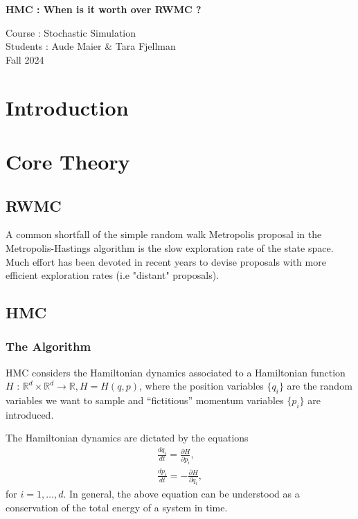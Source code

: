 \documentclass[a4paper, 12pt,oneside]{article}
\begin{document}
 
	\begin{center}
	    \Large
	    \textbf{HMC : When is it worth over RWMC ?} 
	    \vspace{0.4cm}
	    \large

		Course : Stochastic Simulation \\
	    Students : Aude Maier \& Tara Fjellman \\
	    \small{Fall 2024}
	\end{center}

	\section{Introduction}
	\section{Core Theory}
		\subsection{RWMC}
		A common shortfall of the simple random walk Metropolis proposal in the Metropolis-Hastings algorithm is the slow exploration rate of the state space. Much effort has been devoted in recent years to devise proposals with more efficient exploration rates (i.e "distant" proposals).
		\subsection{HMC}
			\subsubsection{The Algorithm}
			HMC considers the Hamiltonian dynamics associated to a Hamiltonian function $H$ : $\mathbb{R}^d \times \mathbb{R}^d \rightarrow \mathbb{R}, H=H(q, p)$, where the position variables $\{q_i\}$ are the random variables we want to sample and ``fictitious'' momentum variables $\{p_i\}$ are introduced. 
			
			The Hamiltonian dynamics are dictated by the equations
			\begin{gather}
			\frac{d q_i}{d t} =\frac{\partial H}{\partial p_i}, \\
			\frac{d p_i}{d t} =-\frac{\partial H}{\partial q_i},
			\end{gather}
			for $i=1, \ldots, d$. In general, the above equation can be understood as a conservation of the total energy of a system in time.
			
\end{document}

